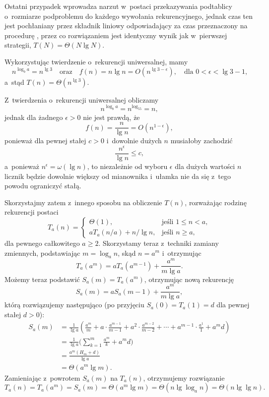 Ostatni przypadek wprowadza narzut w~postaci przekazywania podtablicy o~rozmiarze podproblemu do każdego wywołania rekurencyjnego, jednak czas ten jest pochłaniany przez składnik liniowy odpowiadający za czas przeznaczony na procedurę , przez co rozwiązaniem jest identyczny wynik jak w~pierwszej strategii, $T(N)=\Theta(N\lg N)$.


\subproblem %
Wykorzystując twierdzenie o~rekurencji uniwersalnej, mamy
\[
	n^{\log_ba} = n^{\lg3} \quad\text{oraz}\quad f(n) = n\lg n = O(n^{\lg3-\epsilon}), \quad\text{dla $0<\epsilon<\lg3-1$,}
\]
a~stąd $T(n)=\Theta(n^{\lg3})$.

\subproblem %
Z~twierdzenia o~rekurencji uniwersalnej obliczamy
\[
	n^{\log_ba} = n^{\log_55} = n,
\]
jednak dla żadnego $\epsilon>0$ nie jest prawdą, że
\[
	f(n) = \frac{n}{\lg n} = O(n^{1-\epsilon}),
\]
ponieważ dla pewnej stałej $c>0$ i~dowolnie dużych $n$ musiałoby zachodzić
\[
	\frac{n^\epsilon}{\lg n} \le c,
\]
a~ponieważ $n^\epsilon=\omega(\lg n)$, to niezależnie od wyboru $\epsilon$ dla dużych wartości $n$ licznik będzie dowolnie większy od mianownika i~ułamka nie da się z~tego powodu ograniczyć stałą.

Skorzystajmy zatem z~innego sposobu na obliczenie $T(n)$, rozważając rodzinę rekurencji postaci
\[
	T_a(n) = \begin{cases}
		\Theta(1), & \text{jeśli $1\le n<a$}, \\
		aT_a(n/a)+n/\!\lg n, & \text{jeśli $n\ge a$},
	\end{cases}
\]
dla pewnego całkowitego $a\ge2$. Skorzystamy teraz z~techniki zamiany zmiennych, podstawiając $m=\log_an$, skąd $n=a^m$ i~otrzymując
\[
	T_a(a^m) = aT_a(a^{m-1})+\frac{a^m}{m\lg a}.
\]
Możemy teraz podstawić $S_a(m)=T_a(a^m)$, otrzymując nową rekurencję
\[
	S_a(m) = aS_a(m-1)+\frac{a^m}{m\lg a},
\]
którą rozwiązujemy następująco (po przyjęciu $S_a(0)=T_a(1)=d$ dla pewnej stałej $d>0$):
\begin{align*}
	S_a(m) &= \frac{1}{\lg a}\left(\frac{a^m}{m}+a\cdot\frac{a^{m-1}}{m-1}+a^2\cdot\frac{a^{m-2}}{m-2}+\cdots+a^{m-1}\cdot\frac{a^1}{1}+a^md\right) \\[1mm]
	&= \frac{1}{\lg a}\biggl(\sum_{k=1}^m\frac{a^m}{k}+a^md\biggr) \\[1mm]
	&= \frac{a^m(H_m+d)}{\lg a} \\[1mm]
	&= \Theta(a^m\lg m).
\end{align*}
Zamieniając z~powrotem $S_a(m)$ na $T_a(n)$, otrzymujemy rozwiązanie
\[
	T_a(n) = T_a(a^m) = S_a(m) = \Theta(a^m\lg m) = \Theta(n\lg\log_a n) = \Theta(n\lg\lg n).
\]


